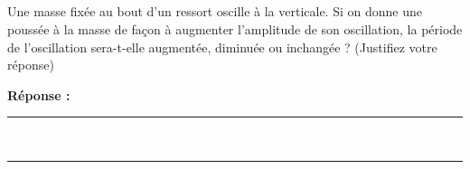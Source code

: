 \subsection{}
Une masse fixée au bout d’un ressort oscille à la verticale. Si on donne une poussée à la masse de façon à augmenter l’amplitude de son oscillation, la période de l’oscillation sera-t-elle augmentée, diminuée ou inchangée ? (Justifiez votre réponse)

\noindent\textbf{Réponse :} \hrulefill \\[2.5ex]
\rule{\linewidth}{0.4pt} \\[2.5ex]
\rule{\linewidth}{0.4pt}
\vfill
